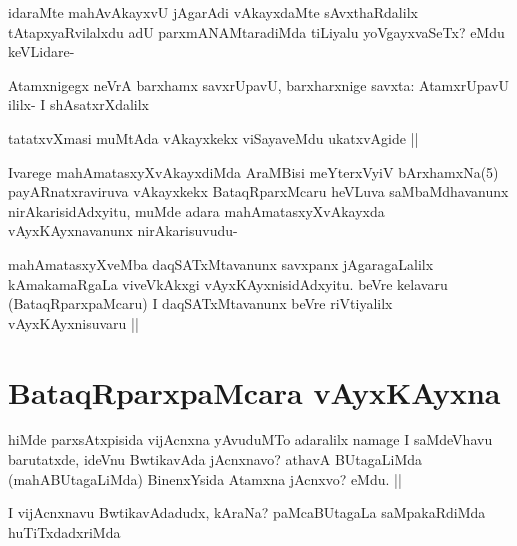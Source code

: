 \begin{artha}
idaraMte mahAvAkayxvU jAgarAdi vAkayxdaMte sAvxthaRdalilx tAtapxyaRvilalxdu adU parxmANAMtaradiMda tiLiyalu yoVgayxvaSeTx? eMdu keVLidare-
\end{artha}


\begin{artha}
Atamxnigegx neVrA barxhamx savxrUpavU, barxharxnige savxta: AtamxrUpavU ililx- I shAsatxrXdalilx
\end{artha}

\begin{artha}
tatatxvXmasi muMtAda vAkayxkekx viSayaveMdu ukatxvAgide ||
\end{artha}

\begin{artha}
Ivarege mahAmatasxyXvAkayxdiMda AraMBisi meYterxVyiV bArxhamxNa(5) payARnatxraviruva vAkayxkekx BataqRparxMcaru heVLuva saMbaMdhavanunx nirAkarisidAdxyitu, muMde adara mahAmatasxyXvAkayxda vAyxKAyxnavanunx nirAkarisuvudu-
\end{artha}

\begin{artha}
mahAmatasxyXveMba daqSATxMtavanunx savxpanx jAgaragaLalilx kAmakamaRgaLa viveVkAkxgi vAyxKAyxnisidAdxyitu. beVre kelavaru (BataqRparxpaMcaru) I daqSATxMtavanunx beVre riVtiyalilx vAyxKAyxnisuvaru ||
\end{artha}

\section*{BataqRparxpaMcara vAyxKAyxna}



\begin{artha}
hiMde parxsAtxpisida vijAcnxna yAvuduMTo adaralilx namage I saMdeVhavu barutatxde, ideVnu BwtikavAda jAcnxnavo? athavA BUtagaLiMda (mahABUtagaLiMda) BinenxYsida Atamxna jAcnxvo? eMdu. ||
\end{artha}


\begin{artha}
I vijAcnxnavu BwtikavAdadudx, kAraNa? paMcaBUtagaLa saMpakaRdiMda huTiTxdadxriMda
\end{artha}

